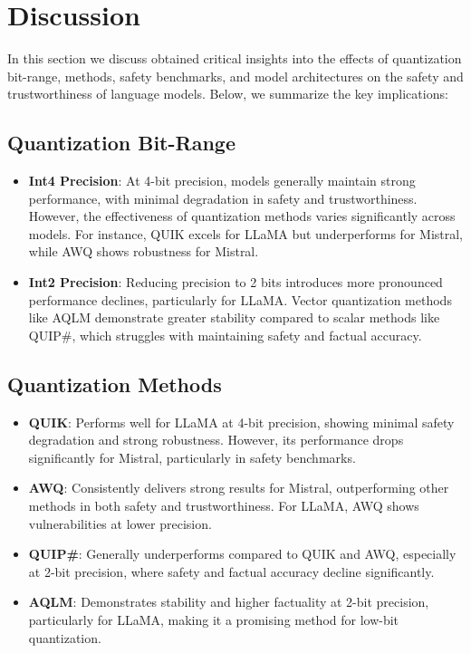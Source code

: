 \section{Discussion}

In this section we discuss obtained critical insights into the effects of quantization bit-range, methods, safety benchmarks, and model architectures on the safety and trustworthiness of language models. Below, we summarize the key implications:

\subsection{Quantization Bit-Range}
\begin{itemize}
    \item \textbf{Int4 Precision}: At 4-bit precision, models generally maintain strong performance, with minimal degradation in safety and trustworthiness. However, the effectiveness of quantization methods varies significantly across models. For instance, QUIK excels for LLaMA but underperforms for Mistral, while AWQ shows robustness for Mistral.
    \item \textbf{Int2 Precision}: Reducing precision to 2 bits introduces more pronounced performance declines, particularly for LLaMA. Vector quantization methods like AQLM demonstrate greater stability compared to scalar methods like QUIP\#, which struggles with maintaining safety and factual accuracy.
\end{itemize}

\subsection{Quantization Methods}
\begin{itemize}
    \item \textbf{QUIK}: Performs well for LLaMA at 4-bit precision, showing minimal safety degradation and strong robustness. However, its performance drops significantly for Mistral, particularly in safety benchmarks.
    \item \textbf{AWQ}: Consistently delivers strong results for Mistral, outperforming other methods in both safety and trustworthiness. For LLaMA, AWQ shows vulnerabilities at lower precision.
    \item \textbf{QUIP\#}: Generally underperforms compared to QUIK and AWQ, especially at 2-bit precision, where safety and factual accuracy decline significantly.
    \item \textbf{AQLM}: Demonstrates stability and higher factuality at 2-bit precision, particularly for LLaMA, making it a promising method for low-bit quantization.
\end{itemize}

